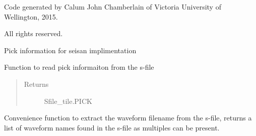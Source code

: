 \documentclass[letterpaper,10pt,english]{sphinxmanual}
\begin{document}
Code generated by Calum John Chamberlain of Victoria University of Wellington,
2015.

All rights reserved.

\begin{fulllineitems}
\label{modules:Sfile_util.PICK}
Pick information for seisan implimentation

\end{fulllineitems}


\begin{fulllineitems}
\label{modules:Sfile_util.readpicks}
Function to read pick informaiton from the s-file
\begin{quote}\begin{description}
\item[{Returns}] \leavevmode
Sfile\_tile.PICK

\end{description}\end{quote}

\end{fulllineitems}


\begin{fulllineitems}
\label{modules:Sfile_util.readwavename}
Convenience function to extract the waveform filename from the s-file,
returns a list of waveform names found in the s-file as multiples can
be present.

\end{fulllineitems}

\end{document}
